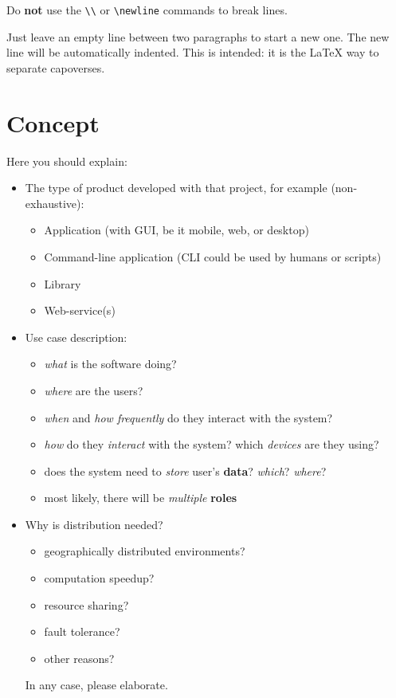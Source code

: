 \documentclass{scrartcl}
\begin{document}
Do \textbf{not} use the \texttt{\textbackslash\textbackslash} or \texttt{\textbackslash newline} commands to break lines.

Just leave an empty line between two paragraphs to start a new one.
%
The new line will be automatically indented.
%
This is intended: it is the \LaTeX{} way to separate capoverses.

\section{Concept}\label{concept}

Here you should explain:

\begin{itemize}
  \item The type of product developed with that project, for example (non-exhaustive):
  \begin{itemize}
    \item Application (with GUI, be it mobile, web, or desktop)
    \item Command-line application (CLI could be used by humans or scripts)
    \item Library
    \item Web-service(s)
  \end{itemize}

  \item Use case description:
  \begin{itemize}
    \item \emph{what} is the software doing?
    \item \emph{where} are the users?
    \item \emph{when} and \emph{how frequently} do they interact with the system?
    \item \emph{how} do they \emph{interact} with the system? which \emph{devices} are they using?
    \item does the system need to \emph{store} user's \textbf{data}? \emph{which}? \emph{where}?
    \item most likely, there will be \emph{multiple} \textbf{roles}
  \end{itemize}

  \item Why is distribution needed?
  \begin{itemize}
    \item geographically distributed environments?
    \item computation speedup?
    \item resource sharing?
    \item fault tolerance?
    \item other reasons?
  \end{itemize}
  In any case, please elaborate.
\end{itemize}
\end{document}
